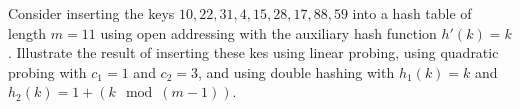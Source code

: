 \begin{homeworkProblem}
Consider inserting the keys $10, 22, 31, 4, 15, 28, 17, 88, 59$ into a hash
table of length $m = 11$ using open addressing with the auxiliary hash function
$h'(k) = k$. Illustrate the result of inserting these kes using linear probing,
using quadratic probing with $c_1 = 1$ and $c_2 = 3$, and using double hashing
with $h_1(k) = k$ and $h_2(k) = 1 + (k \mod(m - 1))$.

\segline

\solution


\end{homeworkProblem}
